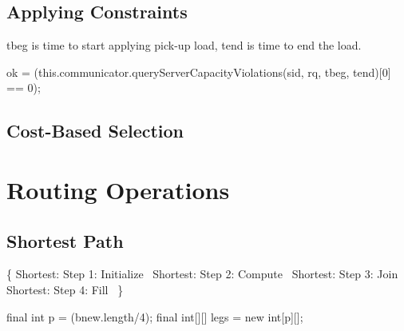 \section{Applying Constraints}

tbeg is time to start applying pick-up load, tend is time to end the load.

\nwenddocs{}\endmoddef\nwstartdeflinemarkup{}\nwenddeflinemarkup
ok = (this.communicator.queryServerCapacityViolations(sid, rq, tbeg, tend)[0] == 0);
\nwendcode{}\nwdocspar


\section{Cost-Based Selection}

\nwenddocs{}\chapter{Routing Operations}
\label{search-routing}

\section{Shortest Path}

\nwenddocs{}\endmoddef\nwstartdeflinemarkup{}\nwenddeflinemarkup
\{
  \LA{}Shortest: Step 1: Initialize~{\nwtagstyle{}}\RA{}
  \LA{}Shortest: Step 2: Compute~{\nwtagstyle{}}\RA{}
  \LA{}Shortest: Step 3: Join~{\nwtagstyle{}}\RA{}
  \LA{}Shortest: Step 4: Fill~{\nwtagstyle{}}\RA{}
\}
\nwendcode{}\nwdocspar

\nwenddocs{}\endmoddef\nwstartdeflinemarkup{}\nwenddeflinemarkup
final int p = (bnew.length/4);
final int[][] legs = new int[p][];

